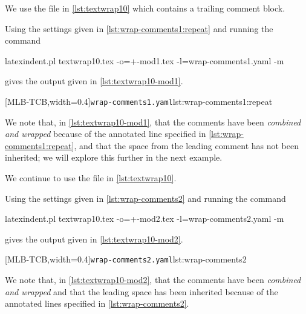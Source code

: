  \begin{example}
 We use the file in \cref{lst:textwrap10} which contains a trailing comment block.


 Using the settings given in \cref{lst:wrap-comments1:repeat} and running the command

 \begin{commandshell}
latexindent.pl textwrap10.tex -o=+-mod1.tex -l=wrap-comments1.yaml -m
   \end{commandshell}

 gives the output given in \cref{lst:textwrap10-mod1}.

 \begin{cmhtcbraster}[raster columns=2,
   raster left skip=-1.5cm,
   raster right skip=-0cm,
   raster column skip=.06\linewidth]
  [MLB-TCB,width=0.4\linewidth]{\texttt{wrap-comments1.yaml}}{lst:wrap-comments1:repeat}
 \end{cmhtcbraster}

 We note that, in \cref{lst:textwrap10-mod1}, that the comments have been \emph{combined
 and wrapped} because of the annotated line specified in
 \cref{lst:wrap-comments1:repeat}, and that the space from the leading comment has not
 been inherited; we will explore this further in the next example.
 \end{example}

 \begin{example}
 We continue to use the file in \cref{lst:textwrap10}.

 Using the settings given in \cref{lst:wrap-comments2} and running the command

 \begin{commandshell}
latexindent.pl textwrap10.tex -o=+-mod2.tex -l=wrap-comments2.yaml -m
   \end{commandshell}

 gives the output given in \cref{lst:textwrap10-mod2}.

 \begin{cmhtcbraster}[raster columns=2,
   raster left skip=-1.5cm,
   raster right skip=-0cm,
   raster column skip=.06\linewidth]
  [MLB-TCB,width=0.4\linewidth]{\texttt{wrap-comments2.yaml}}{lst:wrap-comments2}
 \end{cmhtcbraster}

 We note that, in \cref{lst:textwrap10-mod2}, that the comments have been \emph{combined
 and wrapped} and that the leading space has been inherited because of the annotated
 lines specified in \cref{lst:wrap-comments2}.
 \end{example}


